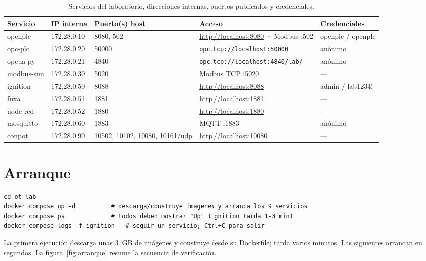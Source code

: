 \begin{table}[H]
\centering\small
\caption{Servicios del laboratorio, direcciones internas, puertos publicados y credenciales.}
\label{tab:servicios}
\begin{tabularx}{\textwidth}{L{1.9cm} L{2.1cm} L{2.6cm} X L{2.6cm}}
\toprule
\textbf{Servicio} & \textbf{IP interna} & \textbf{Puerto(s) host} & \textbf{Acceso} & \textbf{Credenciales} \\
\midrule
openplc    & 172.28.0.10 & 8080, 502   & \url{http://localhost:8080} · Modbus :502 & openplc / openplc \\
opc-plc    & 172.28.0.20 & 50000       & \nolinkurl{opc.tcp://localhost:50000} & anónimo \\
opcua-py   & 172.28.0.21 & 4840        & \nolinkurl{opc.tcp://localhost:4840/lab/} & anónimo \\
modbus-sim & 172.28.0.30 & 5020        & Modbus TCP :5020 & --- \\
ignition   & 172.28.0.50 & 8088        & \url{http://localhost:8088} & admin / lab1234! \\
fuxa       & 172.28.0.51 & 1881        & \url{http://localhost:1881} & --- \\
node-red   & 172.28.0.52 & 1880        & \url{http://localhost:1880} & --- \\
mosquitto  & 172.28.0.60 & 1883        & MQTT :1883 & anónimo \\
conpot     & 172.28.0.90 & 10502, 10102, 10080, 10161/udp & \url{http://localhost:10080} & --- \\
\bottomrule
\end{tabularx}
\end{table}

\section{Arranque}
\label{sec:arranque}

\begin{lstlisting}[style=bash]
cd ot-lab
docker compose up -d          # descarga/construye imagenes y arranca los 9 servicios
docker compose ps             # todos deben mostrar "Up" (Ignition tarda 1-3 min)
docker compose logs -f ignition   # seguir un servicio; Ctrl+C para salir
\end{lstlisting}

La primera ejecución descarga unas 3~GB de imágenes y construye  desde su Dockerfile; tarda varios minutos. Las siguientes arrancan en segundos. La figura~\ref{fig:arranque} resume la secuencia de verificación.

